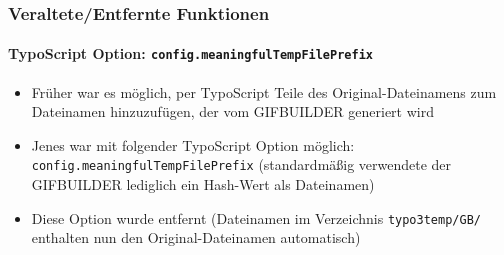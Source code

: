 
\begin{frame}[fragile]
	\frametitle{Veraltete/Entfernte Funktionen}
	\framesubtitle{TypoScript Option: \texttt{config.meaningfulTempFilePrefix}}

	\begin{itemize}

		\item Früher war es möglich, per TypoScript Teile des Original-Dateinamens zum
			Dateinamen hinzuzufügen, der vom GIFBUILDER generiert wird

		\item Jenes war mit folgender TypoScript Option möglich:\newline
			\texttt{config.meaningfulTempFilePrefix}\newline
			\small
				(standardmäßig verwendete der GIFBUILDER lediglich ein Hash-Wert als Dateinamen)
			\normalsize

		\item Diese Option wurde entfernt\newline
			\small
				(Dateinamen im Verzeichnis \texttt{typo3temp/GB/}
				enthalten nun den Original-Dateinamen automatisch)
			\normalsize

	\end{itemize}

\end{frame}




